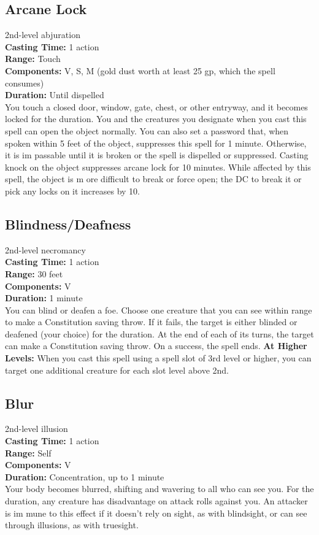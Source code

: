 \documentclass[11pt, A4paper, english]{article}
\begin{document}
		\subsection{Arcane Lock}
2nd-level abjuration \\
\textbf{Casting Time:} 1 action \\
\textbf{Range:} Touch \\
\textbf{Components:} V, S, M (gold dust worth at least 25 gp, which the spell consumes) \\
\textbf{Duration:} Until dispelled \\
You touch a closed door, window, gate, chest, or other entryway, and it becomes locked for the duration. You and the creatures you designate when you cast this spell can open the object normally. You can also set a password that, when spoken within 5 feet of the object, suppresses this spell for 1 minute. Otherwise, it is im passable until it is broken or the spell is dispelled or suppressed. Casting knock on the object suppresses arcane lock for 10 minutes. While affected by this spell, the object is m ore difficult to break or force open; the DC to break it or pick any locks on it increases by 10.

		\subsection{Blindness/Deafness}
2nd-level necromancy \\
\textbf{Casting Time:} 1 action \\
\textbf{Range:} 30 feet \\
\textbf{Components:} V \\
\textbf{Duration:} 1 minute \\
You can blind or deafen a foe. Choose one creature that you can see within range to make a Constitution saving throw. If it fails, the target is either blinded or deafened (your choice) for the duration. At the end of each of its turns, the target can make a Constitution saving throw. On a success, the spell ends.
\textbf{At Higher Levels:} When you cast this spell using a spell slot of 3rd level or higher, you can target one additional creature for each slot level above 2nd.

		\subsection{Blur}
2nd-level illusion \\
\textbf{Casting Time:} 1 action \\
\textbf{Range:} Self \\
\textbf{Components:} V \\
\textbf{Duration:} Concentration, up to 1 minute \\
Your body becomes blurred, shifting and wavering to all who can see you. For the duration, any creature has disadvantage on attack rolls against you. An attacker is im mune to this effect if it doesn’t rely on sight, as with blindsight, or can see through illusions, as with truesight.
\end{document}
